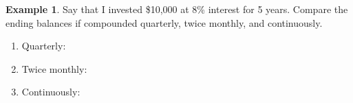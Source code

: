 \documentclass[addpoints,12pt]{exam}
\theoremstyle{definition}
\theoremstyle{break}
\theoremstyle{break}
\newtheorem{example}{Example}[subsection]
\begin{document}
\newpage

\begin{example}
Say that I invested \$10,000 at 8\% interest for 5 years. Compare the ending balances if compounded quarterly, twice monthly, and continuously.
\begin{enumerate}
\item Quarterly:
\vspace{2.25in}
\item Twice monthly:
\vspace{2.25in}
\item Continuously:
\end{enumerate}
\end{example}
\end{document}
